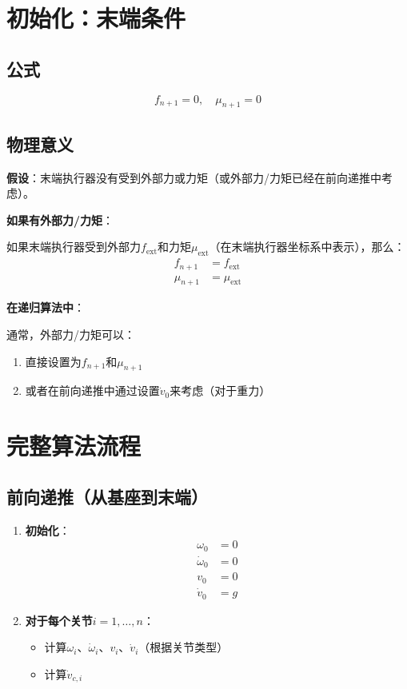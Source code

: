 \documentclass[12pt,a4paper]{article}
\begin{document}
\section{初始化：末端条件}

\subsection{公式}

\begin{equation}
f_{n+1} = 0, \quad \mu_{n+1} = 0
\end{equation}

\subsection{物理意义}

\textbf{假设}：末端执行器没有受到外部力或力矩（或外部力/力矩已经在前向递推中考虑）。

\textbf{如果有外部力/力矩}：

如果末端执行器受到外部力$f_{\text{ext}}$和力矩$\mu_{\text{ext}}$（在末端执行器坐标系中表示），那么：
\begin{align}
f_{n+1} &= f_{\text{ext}} \\
\mu_{n+1} &= \mu_{\text{ext}}
\end{align}

\textbf{在递归算法中}：

通常，外部力/力矩可以：
\begin{enumerate}
\item 直接设置为$f_{n+1}$和$\mu_{n+1}$
\item 或者在前向递推中通过设置$\dot{v}_0$来考虑（对于重力）
\end{enumerate}

\section{完整算法流程}

\subsection{前向递推（从基座到末端）}

\begin{enumerate}
\item \textbf{初始化}：
\begin{align}
\omega_0 &= 0 \\
\dot{\omega}_0 &= 0 \\
v_0 &= 0 \\
\dot{v}_0 &= g
\end{align}

\item \textbf{对于每个关节$i = 1, \ldots, n$}：
\begin{itemize}
\item 计算$\omega_i$、$\dot{\omega}_i$、$v_i$、$\dot{v}_i$（根据关节类型）
\item 计算$\dot{v}_{c,i}$
\end{itemize}
\end{enumerate}
\end{document}

